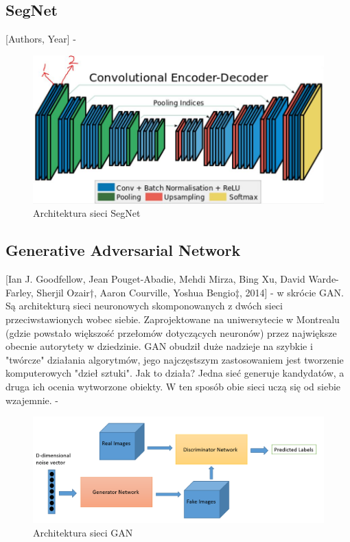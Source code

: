 \documentclass[12pt,a4paper,twoside,titlepage,openright]{book}
\begin{document}
\subsection{SegNet}
[Authors, Year] - \cite{DBLP:journals/corr/BadrinarayananH15}
\begin{figure}[h]
	\centering
			\includegraphics[resolution=100, scale=0.5]{SegNet.png}
		\caption{Architektura sieci SegNet}
\end{figure}

\subsection{Generative Adversarial Network}
[Ian J. Goodfellow, Jean Pouget-Abadie, Mehdi Mirza, Bing Xu, David Warde-Farley, Sherjil Ozair†, Aaron Courville, Yoshua Bengio‡, 2014] - w skrócie GAN. Są architekturą sieci neuronowych skomponowanych z dwóch sieci przeciwstawionych wobec siebie. Zaprojektowane na uniwersytecie w Montrealu (gdzie powstało większość przełomów dotyczących neuronów) przez największe obecnie autorytety w dziedzinie. GAN obudził duże nadzieje na szybkie i "twórcze" działania algorytmów, jego najczęstszym zastosowaniem jest tworzenie komputerowych "dzieł sztuki". Jak to działa? Jedna sieć generuje kandydatów, a druga ich ocenia wytworzone obiekty. W ten sposób obie sieci uczą się od siebie wzajemnie. - \cite{NIPS2014_5423}
\begin{figure}[h]
	\centering
			\includegraphics[resolution=100,scale=0.3]{GAN.png}
		\caption{Architektura sieci GAN}
\end{figure}
\end{document}

